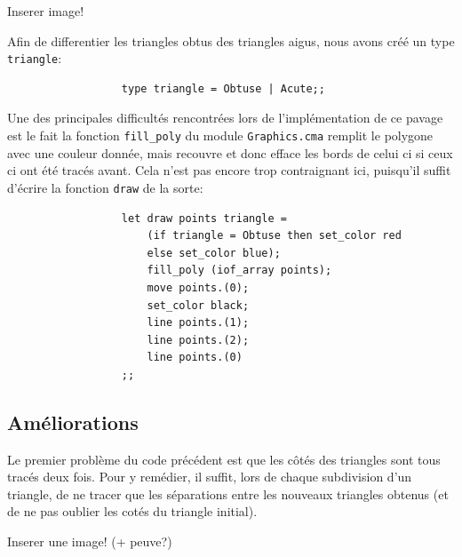 \documentclass[a4paper, 11pt]{article}%
\begin{document}
                Inserer image!

                Afin de differentier les triangles obtus des triangles
                aigus, nous avons créé un type \texttt{triangle}:

		\begin{lstlisting}
                  type triangle = Obtuse | Acute;;
		\end{lstlisting}

                Une des principales difficultés rencontrées lors de
                l'implémentation de ce pavage est le fait la fonction
                \texttt{fill\_poly} du module \texttt{Graphics.cma}
                remplit le polygone avec une couleur donnée, mais
                recouvre et donc efface les bords de celui ci si ceux
                ci ont été tracés avant. Cela n'est pas encore trop
                contraignant ici, puisqu'il suffit d'écrire la
                fonction \texttt{draw} de la sorte:

                \begin{lstlisting}
                  let draw points triangle =
                      (if triangle = Obtuse then set_color red
                      else set_color blue);
                      fill_poly (iof_array points);
                      move points.(0);
                      set_color black;
                      line points.(1);  
                      line points.(2);
                      line points.(0)
                  ;;
                \end{lstlisting}
                
	\subsection{Améliorations}
		Le premier problème du code précédent est que les
                côtés des triangles sont tous tracés deux fois. Pour y
                remédier, il suffit, lors de chaque subdivision d'un
                triangle, de ne tracer que les séparations entre les
                nouveaux triangles obtenus (et de ne pas oublier les
                cotés du triangle initial).

		Inserer une image! (+ peuve?)
\end{document}

